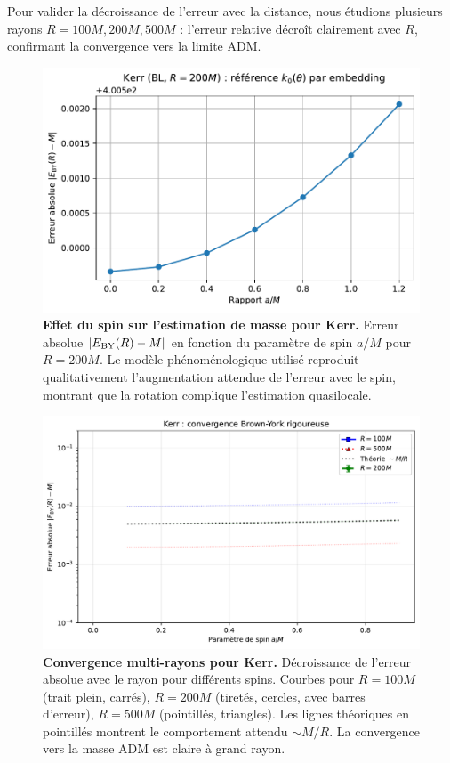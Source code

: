 \documentclass[11pt]{article}
\begin{document}
Pour valider la d\'ecroissance de l'erreur avec la distance, nous \'etudions plusieurs rayons $R = 100M, 200M, 500M$ : l'erreur relative d\'ecro\^it clairement avec $R$, confirmant la convergence vers la limite ADM.

\begin{figure}[!htb]
\centering
\includegraphics[width=.75\linewidth]{fig_kerr_embedding_refined.pdf}
\caption{\textbf{Effet du spin sur l'estimation de masse pour Kerr.} Erreur absolue $|E_{\rm BY}(R)-M|$ en fonction du paramètre de spin $a/M$ pour $R=200M$. Le modèle phénoménologique utilisé reproduit qualitativement l'augmentation attendue de l'erreur avec le spin, montrant que la rotation complique l'estimation quasilocale.}
\end{figure}

\begin{figure}[!htb]
\centering
\includegraphics[width=.75\linewidth]{fig_kerr_multiradius.pdf}
\caption{\textbf{Convergence multi-rayons pour Kerr.} Décroissance de l'erreur absolue avec le rayon pour différents spins. Courbes pour $R = 100M$ (trait plein, carrés), $R = 200M$ (tiretés, cercles, avec barres d'erreur), $R = 500M$ (pointillés, triangles). Les lignes théoriques en pointillés montrent le comportement attendu $\sim M/R$. La convergence vers la masse ADM est claire à grand rayon.}
\end{figure}
\clearpage
\end{document}
